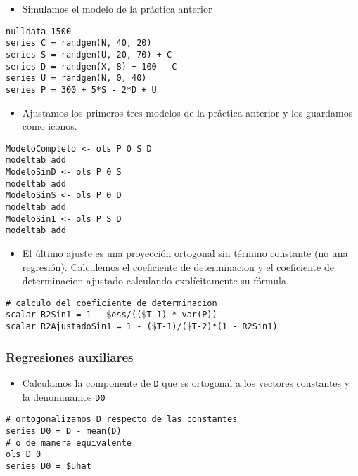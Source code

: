 \documentclass[11pt]{article}
\begin{document}
\begin{itemize}
\item Simulamos el modelo de la práctica anterior
\end{itemize}
\begin{verbatim}
nulldata 1500
series C = randgen(N, 40, 20)
series S = randgen(U, 20, 70) + C
series D = randgen(X, 8) + 100 - C
series U = randgen(N, 0, 40)
series P = 300 + 5*S - 2*D + U
\end{verbatim}

\begin{itemize}
\item Ajustamos los primeros tres modelos de la práctica anterior y los
guardamos como iconos.
\end{itemize}

\begin{verbatim}
ModeloCompleto <- ols P 0 S D
modeltab add    
ModeloSinD <- ols P 0 S
modeltab add
ModeloSinS <- ols P 0 D
modeltab add
ModeloSin1 <- ols P S D
modeltab add
\end{verbatim}

\begin{itemize}
\item El último ajuste es una proyección ortogonal sin término constante
(no una regresión). Calculemos el coeficiente de determinacion y el
coeficiente de determinacion ajustado calculando explícitamente su
fórmula.
\end{itemize}

\begin{verbatim}
# calculo del coeficiente de determinacion
scalar R2Sin1 = 1 - $ess/(($T-1) * var(P))
scalar R2AjustadoSin1 = 1 - ($T-1)/($T-2)*(1 - R2Sin1)
\end{verbatim}

\subsubsection{Regresiones auxiliares}
\label{sec:org03f4d08}

\begin{itemize}
\item Calculamos la componente de \texttt{D} que es ortogonal a los vectores
constantes y la denominamos \texttt{D0}
\end{itemize}

\begin{verbatim}
# ortogonalizamos D respecto de las constantes
series D0 = D - mean(D)
# o de manera equivalente
ols D 0 
series D0 = $uhat

\end{verbatim}
\end{document}
